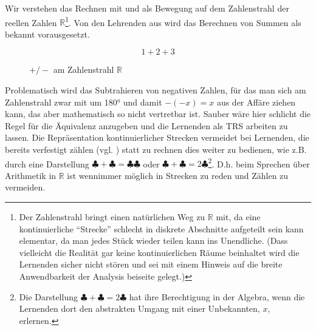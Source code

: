 \documentclass[a4paper]{book}%
\theoremstyle{definition}
\begin{document}
Wir verstehen das Rechnen mit  und  als Bewegung auf dem Zahlenstrahl der reellen Zahlen $\mathbb{R}$\footnote{Der Zahlenstrahl bringt einen natürlichen Weg zu $\mathbb{R}$ mit, da eine kontinuierliche \enquote{Strecke} schlecht in diskrete Abschnitte aufgeteilt sein kann elementar, da man jedes Stück wieder teilen kann ins Unendliche. (Dass vielleicht die Realität gar keine kontinuierlichen Räume beinhaltet wird die Lernenden sicher nicht stören und sei mit einem Hinweis auf die breite Anwendbarkeit der Analysis beiseite gelegt.)}. Von den Lehrenden aus wird das Berechnen von Summen als bekannt vorausgesetzt.

\begin{equation}\label{eqn:00001}
    1 + 2 + 3
\end{equation}

\begin{figure}[H]
  \centering
{}
  \caption{$+/-$ am Zahlenstrahl $\mathbb{R}$}\label{fig:zahlenstrahlAddition}
\end{figure}

Problematisch wird das Subtrahieren von negativen Zahlen, für das man sich am Zahlenstrahl zwar mit  um 180° und damit $-(-x) = x$ aus der Affäre ziehen kann, das aber mathematisch so nicht vertretbar ist. Sauber wäre hier schlicht die Regel für die Äquivalenz anzugeben und die Lernenden als \gls{TRS} arbeiten zu lassen. Die Repräsentation kontinuierlicher Strecken vermeidet bei Lernenden, die bereits verfestigt zählen (vgl. \citep[S. 112]{Hasemann2014}) statt zu rechnen dies weiter zu bedienen, wie z.B. durch eine Darstellung $\clubsuit + \clubsuit = \clubsuit \clubsuit$ oder $\clubsuit + \clubsuit = 2 \clubsuit$\footnote{Die Darstellung $\clubsuit + \clubsuit = 2 \clubsuit$ hat ihre Berechtigung in der Algebra, wenn die Lernenden dort den abstrakten Umgang mit einer Unbekannten, $x$, erlernen.}. D.h. beim Sprechen über Arithmetik in $\mathbb{R}$ ist wennimmer möglich in Strecken zu reden und Zählen zu vermeiden.
\end{document}
